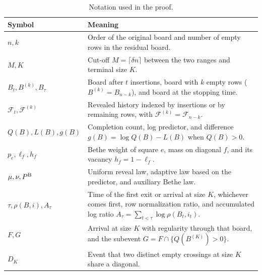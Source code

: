 \begin{table}[!htbp]
\centering\small
\caption{Notation used in the proof.}
\label{tab:proof-notation}
\begin{tabular}{@{}p{.29\linewidth}>{\raggedright\arraybackslash}p{.65\linewidth}@{}}
\toprule
Symbol & Meaning \\
\midrule
$n,k$ & Order of the original board and number of empty rows in the residual board. \\
$M,K$ & Cut-off $M=\lceil\delta n\rceil$ between the two ranges and terminal size $K$. \\
$B_t,B^{(k)},B_\tau$ & Board after $t$ insertions, board with $k$ empty rows
($B^{(k)}=B_{n-k}$), and board at the stopping time. \\
$\mathcal F_t,\mathcal F^{(k)}$ & Revealed history indexed by insertions or by
remaining rows, with $\mathcal F^{(k)}=\mathcal F_{n-k}$. \\
\addlinespace[.22em]
$Q(B),L(B),g(B)$ & Completion count, log predictor, and difference
$g(B)=\log Q(B)-L(B)$ when $Q(B)>0$. \\
$p_e,\ell_f,h_f$ & Bethe weight of square $e$, mass on diagonal $f$, and its vacancy
$h_f=1-\ell_f$. \\
\addlinespace[.22em]
$\mu,\nu,P^{\rm B}$ & Uniform reveal law, adaptive law based on the predictor,
and auxiliary Bethe law. \\
$\tau,\rho(B,i),A_\tau$ & Time of the first exit or arrival at size $K$, whichever
comes first, row normalization ratio, and accumulated log ratio
$A_\tau=\sum_{t<\tau}\log\rho(B_t,i_t)$. \\
\addlinespace[.22em]
$F,G$ & Arrival at size $K$ with regularity through that board, and the
subevent $G=F\cap\{Q(B^{(K)})>0\}$. \\
$D_K$ & Event that two distinct empty crossings at size $K$ share a diagonal. \\
\bottomrule
\end{tabular}
\end{table}
